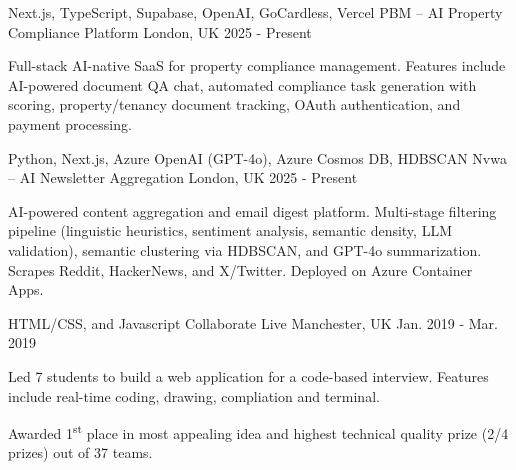 \begin{cventries}
  \cventry
    {Next.js, TypeScript, Supabase, OpenAI, GoCardless, Vercel} %
    {PBM -- AI Property Compliance Platform} %
    {London, UK} %
    {2025 - Present} %
    {
      \begin{cvitems} %
        \item {Full-stack AI-native SaaS for property compliance management. Features include AI-powered document QA chat, automated compliance task generation with scoring, property/tenancy document tracking, OAuth authentication, and payment processing.}
      \end{cvitems}
    }

  \cventry
    {Python, Next.js, Azure OpenAI (GPT-4o), Azure Cosmos DB, HDBSCAN} %
    {Nvwa -- AI Newsletter Aggregation} %
    {London, UK} %
    {2025 - Present} %
    {
      \begin{cvitems} %
        \item {AI-powered content aggregation and email digest platform. Multi-stage filtering pipeline (linguistic heuristics, sentiment analysis, semantic density, LLM validation), semantic clustering via HDBSCAN, and GPT-4o summarization. Scrapes Reddit, HackerNews, and X/Twitter. Deployed on Azure Container Apps.}
      \end{cvitems}
    }


    \cventry
    {HTML/CSS, and Javascript} %
    {Collaborate Live} %
    {Manchester, UK} %
    {Jan. 2019 - Mar. 2019} %
    {
      \begin{cvitems} %
        \item {Led 7 students to build a web application for a code-based interview. Features include real-time coding, drawing, compliation and terminal.}
        \item {Awarded 1\textsuperscript{st} place in most appealing idea and highest technical quality prize (2/4 prizes) out of 37 teams.}
      \end{cvitems}
    }


\end{cventries}
